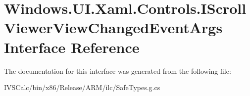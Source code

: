 \hypertarget{interface_windows_1_1_u_i_1_1_xaml_1_1_controls_1_1_i_scroll_viewer_view_changed_event_args}{}\section{Windows.\+U\+I.\+Xaml.\+Controls.\+I\+Scroll\+Viewer\+View\+Changed\+Event\+Args Interface Reference}
\label{interface_windows_1_1_u_i_1_1_xaml_1_1_controls_1_1_i_scroll_viewer_view_changed_event_args}


The documentation for this interface was generated from the following file\+:\begin{DoxyCompactItemize}
\item 
I\+V\+S\+Calc/bin/x86/\+Release/\+A\+R\+M/ilc/Safe\+Types.\+g.\+cs\end{DoxyCompactItemize}
